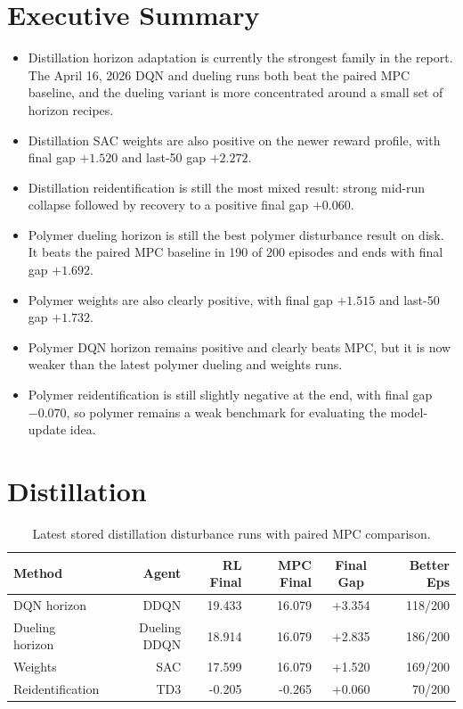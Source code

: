 \documentclass[11pt]{article}
\begin{document}
\section*{Executive Summary}

\begin{itemize}
\item Distillation horizon adaptation is currently the strongest family in the
      report. The April 16, 2026 DQN and dueling runs both beat the paired MPC
      baseline, and the dueling variant is more concentrated around a small set
      of horizon recipes.
\item Distillation SAC weights are also positive on the newer reward profile,
      with final gap \(+1.520\) and last-50 gap \(+2.272\).
\item Distillation reidentification is still the most mixed result: strong
      mid-run collapse followed by recovery to a positive final gap \(+0.060\).
\item Polymer dueling horizon is still the best polymer disturbance result on
      disk. It beats the paired MPC baseline in 190 of 200 episodes and ends
      with final gap \(+1.692\).
\item Polymer weights are also clearly positive, with final gap \(+1.515\) and
      last-50 gap \(+1.732\).
\item Polymer DQN horizon remains positive and clearly beats MPC, but it is now
      weaker than the latest polymer dueling and weights runs.
\item Polymer reidentification is still slightly negative at the end, with final
      gap \(-0.070\), so polymer remains a weak benchmark for evaluating the
      model-update idea.
\end{itemize}

\section*{Distillation}

\begin{table}[H]
\centering
\small
\begin{tabular}{lrrrcr}
\toprule
Method & Agent & RL Final & MPC Final & Final Gap & Better Eps \\
\midrule
DQN horizon & DDQN & 19.433 & 16.079 & +3.354 & 118/200 \\
Dueling horizon & Dueling DDQN & 18.914 & 16.079 & +2.835 & 186/200 \\
Weights & SAC & 17.599 & 16.079 & +1.520 & 169/200 \\
Reidentification & TD3 & -0.205 & -0.265 & +0.060 & 70/200 \\
\bottomrule
\end{tabular}
\caption{Latest stored distillation disturbance runs with paired MPC comparison.}
\end{table}
\end{document}
